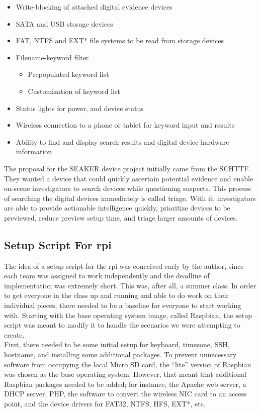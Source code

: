 \documentclass[12pt]{article}
\begin{document}
\begin{itemize}
  \item Write-blocking of attached digital evidence devices
  \item SATA and USB storage devices
  \item FAT, NTFS and EXT* file systems to be read from storage devices
  \item Filename-keyword filter
  \begin{itemize}
    \item Prepopulated keyword list
    \item Customization of keyword list
  \end{itemize}
  \item Status lights for power, and device status
  \item Wireless connection to a phone or tablet for keyword input and results
  \item Ability to find and display search results and digital device hardware information
\end{itemize}

The proposal for the SEAKER device project initially came from the SCHTTF.  They wanted
a device that could quickly ascertain potential evidence and enable on-scene investigators
to search devices while questioning suspects.  This process of searching the digital devices
immediately is called triage.  With it, investigators are able to provide actionable
intelligence quickly, prioritize devices to be previewed, reduce preview setup time, and
triage larger amounts of devices.\\

\subsection{Setup Script For \gls{rpi}}

The idea of a setup script for the \gls{rpi} was conceived early by the author, since
each team was assigned to work independently and the deadline of implementation was
extremely short.  This was, after all, a summer class.  In order to get everyone in
the class up and running and able to do work on their individual pieces, there
needed to be a baseline for everyone to start working with.  Starting with the 
base operating system image, called Raspbian, the setup script was meant to modify
it to handle the scenarios we were attempting to create.\\

First, there needed to be some initial setup for keyboard, timezone, SSH, hostname,
and installing some additional packages.  To prevent unnecessary 
software from occupying the local Micro SD card, the ``lite'' version of Raspbian
was chosen as the base operating system.  However, that meant that additional
Raspbian packages needed to be added; for instance, the Apache web server, a DHCP
server, PHP, the software to convert the wireless NIC card to an access point, and
the device drivers for FAT32, NTFS, HFS, EXT*, etc.\\
\end{document}
